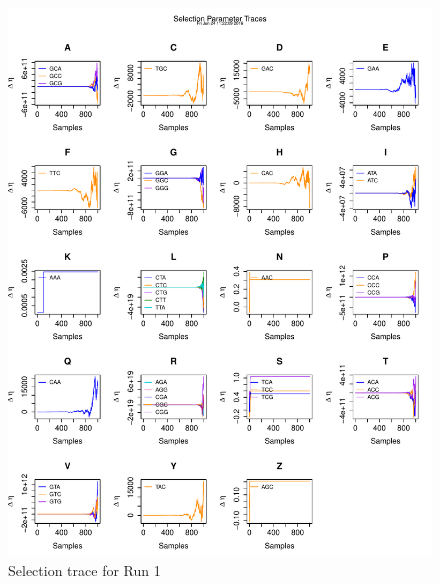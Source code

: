 \documentclass[11pt]{labbook}
\begin{document}
\begin{itemize}
\begin{figure}
        \includegraphics[scale=.65]{FONSE_Plots/2016/June_24/Run1_SelectionTrace}
        \caption{Selection trace for Run 1}
        \label{fig:JUN24_SEL_R1}
    \end{figure}
    \begin{figure}
        \centering

\end{figure}
\end{itemize}
\end{document}
